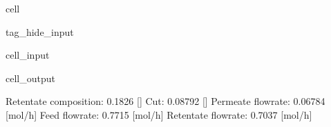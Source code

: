 \documentclass[letterpaper,10pt,english]{jupyterBook}
\begin{document}
\begin{sphinxuseclass}{cell}
\begin{sphinxuseclass}{tag_hide_input}
\begin{sphinxVerbatimInput}
\begin{sphinxuseclass}{cell_input}
\end{sphinxuseclass}\end{sphinxVerbatimInput}
\begin{sphinxVerbatimOutput}

\begin{sphinxuseclass}{cell_output}
\begin{sphinxVerbatim}[commandchars=\\\{\}]
Retentate composition:  0.1826  [\PYGZhy{}]
Cut:  0.08792 [\PYGZhy{}]
Permeate flowrate:  0.06784  [mol/h]
Feed flowrate:  0.7715  [mol/h]
Retentate flowrate:  0.7037  [mol/h]
\end{sphinxVerbatim}

\end{sphinxuseclass}\end{sphinxVerbatimOutput}

\end{sphinxuseclass}
\end{sphinxuseclass}
\sphinxAtStartPar
{}
\end{document}
